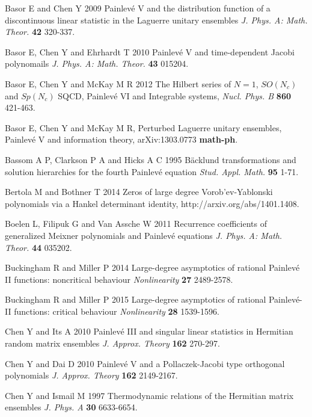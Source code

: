 \documentclass[12pt]{article}
\def\B{\rm{B\"ack\-lund }}
\def\P{Painlev\'e }
\numberwithin{figure}{section}
\numberwithin{equation}{section}
\numberwithin{table}{section}
\begin{document}
\newpage
\begin{thebibliography}{9}

  {Basor E and Chen Y} 2009 {Painlev\'e V and the distribution function of a discontinuous linear statistic in the Laguerre unitary ensembles}
  {\it{J. Phys. A: Math. Theor.}} {\bf{42}} 320-337.

  {Basor E, Chen Y and Ehrhardt T} 2010 {Painlev\'e V and time-dependent Jacobi polynomails} {\it{J. Phys. A: Math. Theor.}} {\bf{43}} 015204.

  {Basor E, Chen Y and McKay M R} 2012 The Hilbert series of $N = 1$, $SO(N_c)$ and $Sp(N_c)$ SQCD, \P VI and Integrable
systems, {\it{Nucl. Phys. B}} {\bf{860}} 421-463.

  {Basor E, Chen Y and McKay M R}, Perturbed Laguerre unitary ensembles, \P V and information theory, arXiv:1303.0773 {\bf{math-ph}}.

  {Bassom A P, Clarkson P A and Hicks A C} 1995 {\B transformations and
solution hierarchies for the fourth \P equation} {\it{Stud. Appl. Math.}} {\bf{95}} 1-71.

  {Bertola M and Bothner T} 2014 Zeros of large degree Vorob'ev-Yablonski polynomials via a Hankel determinant identity, http://arxiv.org/abs/1401.1408.

  {Boelen L, Filipuk G and Van Assche W} 2011 {Recurrence coefficients of generalized Meixner polynomials and Painlev\'e equations} {\it{J.
  Phys. A: Math. Theor.}} {\bf{44}} 035202.

  {Buckingham R and Miller P} 2014 Large-degree asymptotics of rational \P II functions: noncritical behaviour {\it{Nonlinearity}} {\bf{27}} 2489-2578.

  {Buckingham R and Miller P} 2015 Large-degree asymptotics of rational Painlevé-II functions: critical behaviour {\it{Nonlinearity}} {\bf{28}} 1539-1596.

  {Chen Y and Its A} 2010 {Painlev\'e III and singular linear statistics in Hermitian random matrix ensembles} {\it{J. Approx. Theory}} {\bf{162}} 270-297.

  {Chen Y and Dai D} 2010 {Painlev\'e V and a Pollaczek-Jacobi type orthogonal polynomials} {\it{J. Approx. Theory}} {\bf{162}} 2149-2167.


  {Chen Y and Ismail M} 1997 {Thermodynamic relations of the Hermitian matrix ensembles} {\it{J. Phys. A}} {\bf{30}} 6633-6654.


\end{thebibliography}
\end{document}
